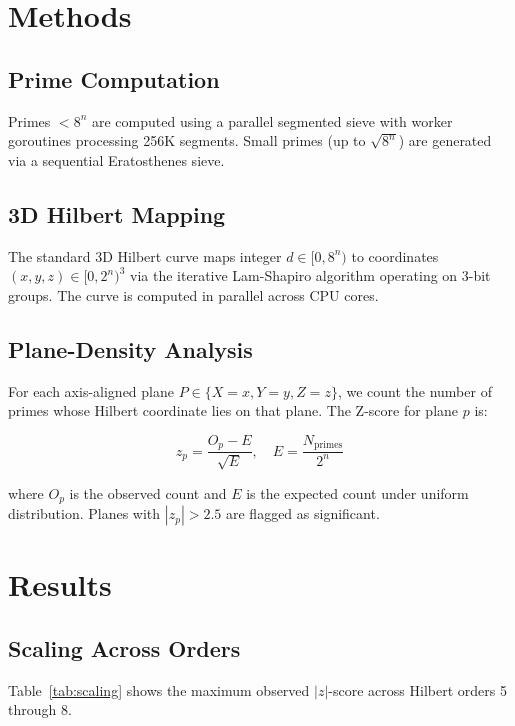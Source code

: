 \documentclass[11pt,a4paper]{article}
\begin{document}
\section{Methods}

\subsection{Prime Computation}

Primes $< 8^n$ are computed using a parallel segmented sieve with worker
goroutines processing 256K segments. Small primes (up to $\sqrt{8^n}$)
are generated via a sequential Eratosthenes sieve.

\subsection{3D Hilbert Mapping}

The standard 3D Hilbert curve maps integer $d \in [0, 8^n)$ to coordinates
$(x,y,z) \in [0, 2^n)^3$ via the iterative Lam-Shapiro algorithm operating
on 3-bit groups. The curve is computed in parallel across CPU cores.

\subsection{Plane-Density Analysis}

For each axis-aligned plane $P \in \{X=x, Y=y, Z=z\}$, we count the number
of primes whose Hilbert coordinate lies on that plane. The Z-score for
plane $p$ is:

\begin{equation}
z_p = \frac{O_p - E}{\sqrt{E}}, \quad E = \frac{N_{\text{primes}}}{2^n}
\end{equation}

where $O_p$ is the observed count and $E$ is the expected count under
uniform distribution. Planes with $|z_p| > 2.5$ are flagged as significant.

\section{Results}

\subsection{Scaling Across Orders}

Table~\ref{tab:scaling} shows the maximum observed $|z|$-score across
Hilbert orders 5 through 8.
\end{document}
